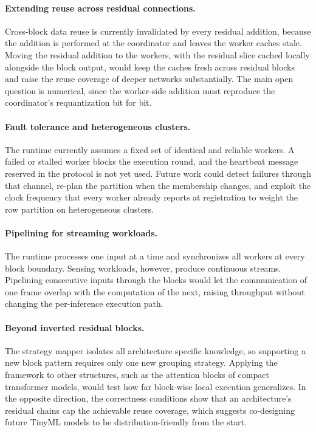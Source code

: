 \paragraph{Extending reuse across residual connections.}
Cross-block data reuse is currently invalidated by every residual addition, because the addition is performed at the coordinator and leaves the worker caches stale.
Moving the residual addition to the workers, with the residual slice cached locally alongside the block output, would keep the caches fresh across residual blocks and raise the reuse coverage of deeper networks substantially.
The main open question is numerical, since the worker-side addition must reproduce the coordinator's requantization bit for bit.

\paragraph{Fault tolerance and heterogeneous clusters.}
The runtime currently assumes a fixed set of identical and reliable workers.
A failed or stalled worker blocks the execution round, and the heartbeat message reserved in the protocol is not yet used.
Future work could detect failures through that channel, re-plan the partition when the membership changes, and exploit the clock frequency that every worker already reports at registration to weight the row partition on heterogeneous clusters.

\paragraph{Pipelining for streaming workloads.}
The runtime processes one input at a time and synchronizes all workers at every block boundary.
Sensing workloads, however, produce continuous streams.
Pipelining consecutive inputs through the blocks would let the communication of one frame overlap with the computation of the next, raising throughput without changing the per-inference execution path.

\paragraph{Beyond inverted residual blocks.}
The strategy mapper isolates all architecture specific knowledge, so supporting a new block pattern requires only one new grouping strategy.
Applying the framework to other structures, such as the attention blocks of compact transformer models, would test how far block-wise local execution generalizes.
In the opposite direction, the correctness conditions show that an architecture's residual chains cap the achievable reuse coverage, which suggests co-designing future TinyML models to be distribution-friendly from the start.

